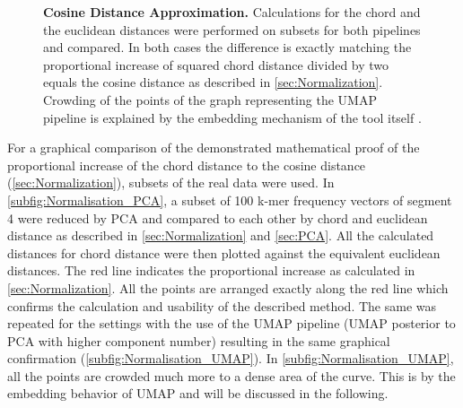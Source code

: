 \begin{figure}[!hbt]
\begin{subfigure}[b]{0.475\textwidth}
    \end{subfigure}
    \caption[Cosine Distance Approximation]{\textbf{Cosine Distance Approximation.} Calculations for the chord and the euclidean distances were performed on subsets for both pipelines and compared. In both cases the difference is exactly matching the proportional increase of squared chord distance divided by two equals the cosine distance as described in \autoref{sec:Normalization}. Crowding of the points of the graph representing the \gls{UMAP} pipeline is explained by the embedding mechanism of the tool itself \autocite{mcinnes_umap_2020}.}
    \label{fig:Normalisation_Methods}
\end{figure}

For a graphical comparison of the demonstrated mathematical proof of the proportional increase of the chord distance to the cosine distance (\autoref{sec:Normalization}), subsets of the real data were used. In \autoref{subfig:Normalisation_PCA}, a subset of 100 k-mer frequency vectors of segment 4 were reduced by \gls{PCA} and compared to each other by chord and euclidean distance as described in \autoref{sec:Normalization} and \autoref{sec:PCA}. All the calculated distances for chord distance were then plotted against the equivalent euclidean distances. The red line indicates the proportional increase as calculated in \autoref{sec:Normalization}. All the points are arranged exactly along the red line which confirms the calculation and usability of the described method. The same was repeated for the settings with the use of the \gls{UMAP} pipeline (\gls{UMAP} posterior to \gls{PCA} with higher component number) resulting in the same graphical confirmation (\autoref{subfig:Normalisation_UMAP}). In \autoref{subfig:Normalisation_UMAP}, all the points are crowded much more to a dense area of the curve. This is by the embedding behavior of \gls{UMAP} and will be discussed in the following.











